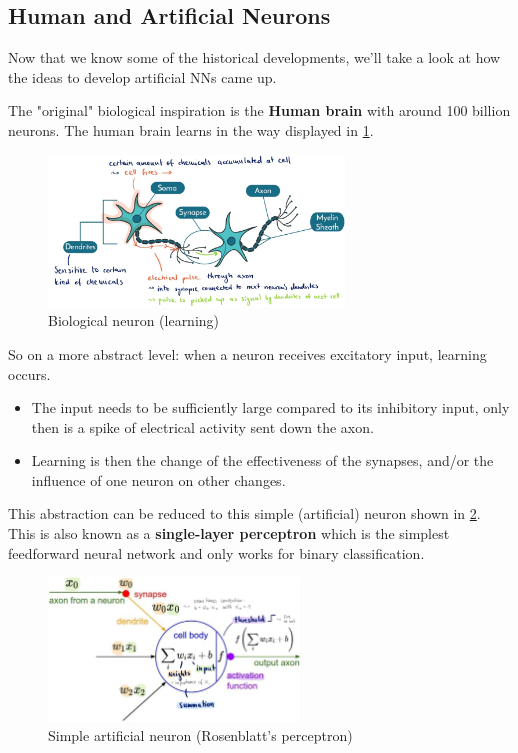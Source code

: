 
\subsection{Human and Artificial Neurons}
Now that we know some of the historical developments, we'll take a look at how the ideas to develop artificial NNs came up.

The "original" biological inspiration is the \textbf{Human brain} with around 100 billion neurons. The human brain learns in the way displayed in \ref{fig:6_bg_bio_neuron}.

\begin{figure}[H]
  \centering
  \includegraphics[width=0.7\textwidth]{assets/nn/bg__bio_neuron.png}
  \caption{Biological neuron (learning)}
  \label{fig:6_bg_bio_neuron}
\end{figure}

So on a more abstract level: when a neuron receives excitatory input, learning occurs.
\begin{itemize}
  \item The input needs to be sufficiently large compared to its inhibitory input, only then is a spike of electrical activity sent down the axon.
  \item Learning is then the change of the effectiveness of the synapses, and/or the influence of one neuron on other changes.
\end{itemize}

This abstraction can be reduced to this simple (artificial) neuron shown in \ref{fig:6_bg_simple_an}. This is also known as a \textbf{single-layer perceptron} which is the simplest feedforward neural network and only works for binary classification.

\begin{figure}[H]
  \centering
  \includegraphics[width=0.6\textwidth]{assets/nn/bg__simple_artificial_neuron.png}
  \caption{Simple artificial neuron (Rosenblatt's perceptron)}
  \label{fig:6_bg_simple_an}
\end{figure}

